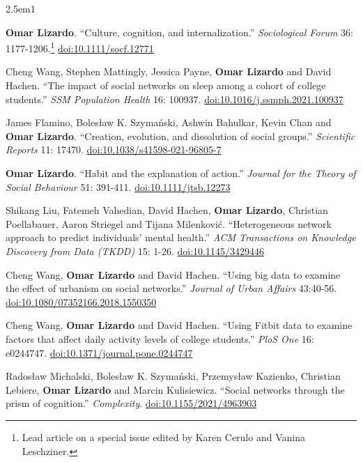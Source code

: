 \documentclass[
]{article}
\newenvironment{cventry}{\begin{hangparas}{2.5em}{1}}{\end{hangparas}}
\begin{document}
\begin{cventry}

\textbf{Omar Lizardo}. ``Culture, cognition, and internalization.''
\emph{Sociological Forum} 36: 1177-1206.\footnote{Lead article on a
  special issue edited by Karen Cerulo and Vanina Leschziner.}
\href{https://doi.org/10.1111/socf.12771}{doi:10.1111/socf.12771}

Cheng Wang, Stephen Mattingly, Jessica Payne, \textbf{Omar Lizardo} and
David Hachen. ``The impact of social networks on sleep among a cohort of
college students.'' \emph{SSM Population Health} 16: 100937.
\href{https://doi.org/10.1016/j.ssmph.2021.100937}{doi:10.1016/j.ssmph.2021.100937}

James Flamino, Bolesław K. Szymański, Ashwin Bahulkar, Kevin Chan and
\textbf{Omar Lizardo}. ``Creation, evolution, and dissolution of social
groups.'' \emph{Scientific Reports} 11: 17470.
\href{https://doi.org/10.1038/s41598-021-96805-7}{doi:10.1038/s41598-021-96805-7}

\textbf{Omar Lizardo}. ``Habit and the explanation of action.''
\emph{Journal for the Theory of Social Behaviour} 51: 391-411.
\href{https://doi.org/10.1111/jtsb.12273}{doi:10.1111/jtsb.12273}

Shikang Liu, Fatemeh Vahedian, David Hachen, \textbf{Omar Lizardo},
Christian Poellabauer, Aaron Striegel and Tijana Milenković.
``Heterogeneous network approach to predict individuals' mental
health.'' \emph{ACM Transactions on Knowledge Discovery from Data
(TKDD)} 15: 1-26.
\href{https://doi.org/10.1145/3429446}{doi:10.1145/3429446}

Cheng Wang, \textbf{Omar Lizardo} and David Hachen. ``Using big data to
examine the effect of urbanism on social networks.'' \emph{Journal of
Urban Affairs} 43:40-56.
\href{https://doi.org/10.1080/07352166.2018.1550350}{doi:10.1080/07352166.2018.1550350}

Cheng Wang, \textbf{Omar Lizardo} and David Hachen. ``Using Fitbit data
to examine factors that affect daily activity levels of college
students.'' \emph{PloS One} 16: e0244747.
\href{https://doi.org/10.1371/journal.pone.0244747}{doi:10.1371/journal.pone.0244747}

Radosław Michalski, Bolesław K. Szymański, Przemysław Kazienko,
Christian Lebiere, \textbf{Omar Lizardo} and Marcin Kulisiewicz.
``Social networks through the prism of cognition.'' \emph{Complexity}.
\href{https://doi.org/10.1155/2021/4963903}{doi:10.1155/2021/4963903}

\end{cventry}
\end{document}
